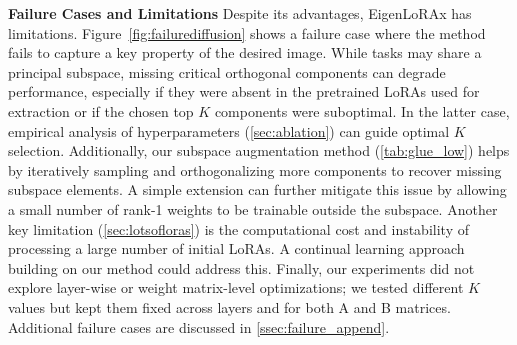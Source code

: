 \textbf{Failure Cases and Limitations} Despite its advantages, EigenLoRAx has limitations. Figure~\ref{fig:failurediffusion} shows a failure case where the method fails to capture a key property of the desired image. While tasks may share a principal subspace, missing critical orthogonal components can degrade performance, especially if they were absent in the pretrained LoRAs used for extraction or if the chosen top $K$ components were suboptimal. In the latter case, empirical analysis of hyperparameters (\cref{sec:ablation}) can guide optimal $K$ selection. Additionally, our subspace augmentation method (\cref{tab:glue_low}) helps by iteratively sampling and orthogonalizing more components to recover missing subspace elements. A simple extension can further mitigate this issue by allowing a small number of rank-1 weights to be trainable outside the subspace. Another key limitation (\cref{sec:lotsofloras}) is the computational cost and instability of processing a large number of initial LoRAs. A continual learning approach building on our method could address this. Finally, our experiments did not explore layer-wise or weight matrix-level optimizations; we tested different $K$ values but kept them fixed across layers and for both A and B matrices. Additional failure cases are discussed in \cref{ssec:failure_append}.
